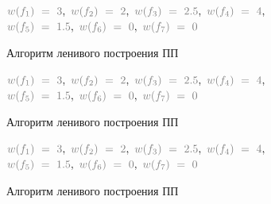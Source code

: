 \documentclass[utf8]{beamer}
\begin{document}
\begin{frame}
	\begin{exampleblock}{}
		\begin{center} 
				${\color{gray}w(f_1)\ =\ 3},\ {\color{gray}w(f_2)\ =\ 2},\
				{\color{gray}w(f_3)\ =\ 2.5},\ {\color{gray}w(f_4)\ =\ 4},$ 
				\\${\color{gray}w(f_5)\ =\ 1.5},\ {\color{gray}w(f_6)\ =\ 0},\
				{\color{gray}w(f_7)\ =\ 0}$
		\end{center}  
	\end{exampleblock}
	\begin{block}{Алгоритм ленивого построения ПП}
		\picLazyCTwelfth                               
	\end{block}
\end{frame} 

\begin{frame}
	\begin{exampleblock}{}
		\begin{center} 
				${\color{gray}w(f_1)\ =\ 3},\ {\color{gray}w(f_2)\ =\ 2},\
				{\color{gray}w(f_3)\ =\ 2.5},\ {\color{gray}w(f_4)\ =\ 4},$ 
				\\${\color{gray}w(f_5)\ =\ 1.5},\ {\color{gray}w(f_6)\ =\ 0},\
				{\color{gray}w(f_7)\ =\ 0}$
		\end{center}  
	\end{exampleblock}
	\begin{block}{Алгоритм ленивого построения ПП}
		\picLazyCThirteenth                                    
	\end{block}
\end{frame} 

\begin{frame}
	\begin{exampleblock}{}
		\begin{center} 
				${\color{gray}w(f_1)\ =\ 3},\ {\color{gray}w(f_2)\ =\ 2},\
				{\color{gray}w(f_3)\ =\ 2.5},\ {\color{gray}w(f_4)\ =\ 4},$ 
				\\${\color{gray}w(f_5)\ =\ 1.5},\ {\color{gray}w(f_6)\ =\ 0},\
				{\color{gray}w(f_7)\ =\ 0}$
		\end{center}  
	\end{exampleblock}
	\begin{block}{Алгоритм ленивого построения ПП}
		\picLazyCFourteenth                                    
	\end{block}
\end{frame} 
\end{document}

